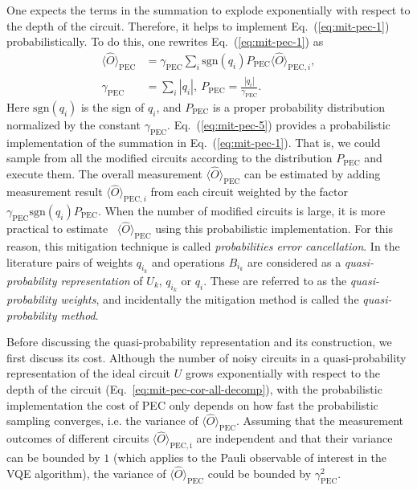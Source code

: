 One expects the terms in the summation to explode exponentially
with respect to the depth of the circuit.
Therefore, it helps to implement Eq.~(\ref{eq:mit-pec-1}) probabilistically.
To do this, one rewrites Eq.~(\ref{eq:mit-pec-1}) as
\begin{equation}
    \label{eq:mit-pec-5}
    \begin{split}
        \langle \hat{O} \rangle_{\mathrm{PEC}} & =\gamma _{\mathrm{PEC}}\sum _{i}\mathrm{sgn}( q_{i}) P_{\mathrm{PEC}} \langle \hat{O} \rangle_{\mathrm{PEC} ,i} ,\\
        \gamma _{\mathrm{PEC}} & =\sum _{i} |q_{i} |,\ P_{\mathrm{PEC}} =\frac{| q_{i}| }{\gamma _{\mathrm{PEC}}} .
    \end{split}
\end{equation}
Here $\mathrm{sgn}( q_{i})$ is the sign of $q_{i}$, and $P_{\mathrm{PEC}}$ is a proper probability distribution normalized by the constant $\gamma _{\mathrm{PEC}}$. Eq.~(\ref{eq:mit-pec-5}) provides a probabilistic implementation of the summation in Eq.~(\ref{eq:mit-pec-1}). That is, we could sample from all the modified circuits according to the distribution $P_\mathrm{PEC}$ and execute them. The overall measurement $\langle \hat{O} \rangle_{\mathrm{PEC}}$ can be estimated by adding measurement result $\langle \hat{O} \rangle_{\mathrm{PEC} ,i}$ from each circuit weighted by the factor $\gamma _{\mathrm{PEC}}\mathrm{sgn}( q_{i}) P_{\mathrm{PEC}}$. When the number of modified circuits is large, it is more practical to estimate \ $\langle \hat{O} \rangle_{\mathrm{PEC}}$ using this probabilistic implementation. For this reason, this mitigation technique is called \textit{probabilities error cancellation}.
In the literature \cite{endoPracticalQuantumError2018, temmeErrorMitigationShortDepth2017} pairs of weights $q_{i_k}$ and operations $B_{i_k}$ are considered as a \textit{quasi-probability representation} of $U_k$, $q_{i_k}$ or $q_i$. These are referred to as the \textit{quasi-probability weights}, and incidentally the mitigation method is called the \textit{quasi-probability method}.

Before discussing the quasi-probability representation and its construction, we first discuss its cost. Although the number of noisy circuits in a quasi-probability representation of the ideal circuit $U$ grows exponentially with respect to the depth of the circuit (Eq.~\ref{eq:mit-pec-cor-all-decomp}),
with the probabilistic implementation the cost of PEC only depends on how fast the probabilistic sampling converges,
i.e. the variance of $\langle \hat{O} \rangle_{\mathrm{PEC}}$. Assuming that the measurement outcomes of different circuits $\langle \hat{O} \rangle_{\mathrm{PEC,i}}$ are independent and that their variance can be bounded by $1$
(which applies to the Pauli observable of interest in the VQE algorithm), the variance of $\langle \hat{O} \rangle_{\mathrm{PEC}}$ could be bounded by $\gamma_{\mathrm{PEC}}^2$.

